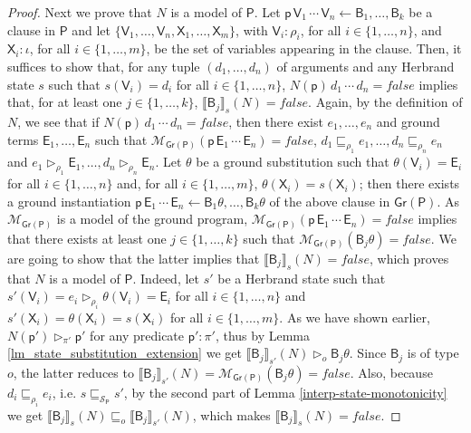 \documentclass[submission,copyright]{eptcs}
\theoremstyle{definition}
\newcommand{\mwrs}[3]{\llbracket#1\rrbracket_{#3}(#2)}
\newcommand{\aleq}[1][]{\sqsubseteq_{#1}}
\newcommand{\ee}[1][I]{\rhd_{#1}}
\newcommand{\bezem}{\mathcal{M}_\mathsf{Gr(P)}}
\begin{document}
\begin{proof}
Next we prove that $N$ is a model of $\mathsf{P}$. Let $\mathsf{p} \, \mathsf{V}_1 \, \cdots \, \mathsf{V}_n \leftarrow \mathsf{B}_1,\ldots,\mathsf{B}_k$ be a clause in $\mathsf{P}$ and let $\{\mathsf{V}_1, \ldots, \mathsf{V}_n, \mathsf{X}_1, \ldots, \mathsf{X}_m\}$, with $\mathsf{V}_i:\rho_i$, for all $i\in \{1, \ldots,n\}$, and $\mathsf{X}_i:\iota$, for all $i\in \{1, \ldots,m\}$, be the set of variables appearing in the clause. Then, it suffices to show that, for any tuple $(d_1, \ldots, d_n)$ of arguments and any Herbrand state $s$ such that $s(\mathsf{V}_i) = d_i$ for all $i\in\{1,\ldots, n\}$, $N(\mathsf{p})\,d_1\,\cdots\,d_n = \mathit{false}$ implies that, for at least one $j \in \{1,\ldots,k\}$, $\mwrs{\mathsf{B}_j}{N}{s} = \mathit{false}$. Again, by the definition of $N$, we see that if $N(\mathsf{p})\,d_1\,\cdots\,d_n = \mathit{false}$, then there exist $e_1, \ldots, e_n$ and ground terms $\mathsf{E}_1,\ldots,\mathsf{E}_n$ such that $\bezem(\mathsf{p}\, \mathsf{E}_1 \, \cdots \, \mathsf{E}_n)=\mathit{false}$, $d_1 \aleq[\rho_1] e_1, \ldots, d_n \aleq[\rho_n] e_n$ and $e_1 \ee[\rho_1] \mathsf{E}_1, \ldots, d_n \ee[\rho_n] \mathsf{E}_n$. Let $\theta$ be a ground substitution such that $\theta(\mathsf{V}_i) = \mathsf{E}_i$ for all $i\in\{1,\ldots,n\}$ and, for all $i\in\{1,\ldots,m\}$, $\theta(\mathsf{X}_i) = s(\mathsf{X}_i)$; then there exists a ground instantiation $\mathsf{p} \, \mathsf{E}_1 \, \cdots \, \mathsf{E}_n \leftarrow \mathsf{B}_1\theta,\ldots,\mathsf{B}_k\theta$ of the above clause in $\mathsf{Gr(P)}$. As $\bezem$ is a model of the ground program, $\bezem(\mathsf{p}\, \mathsf{E}_1 \, \cdots \, \mathsf{E}_n)=\mathit{false}$ implies that there exists at least one $j \in \{1,\ldots,k\}$ such that $\bezem(\mathsf{B}_j\theta)=\mathit{false}$. We are going to show that the latter implies that $\mwrs{\mathsf{B}_j}{N}{s} = \mathit{false}$, which proves that $N$ is a model of $\mathsf{P}$. Indeed, let $s'$ be a Herbrand state such that $s'(\mathsf{V}_i) = e_i \ee[\rho_i] \theta(\mathsf{V}_i) = \mathsf{E}_i$ for all $i\in\{1,\ldots, n\}$ and $s'(\mathsf{X}_i)=\theta(\mathsf{X}_i)=s(\mathsf{X}_i)$ for all $i\in\{1,\ldots,m\}$. As we have shown earlier, $N(\mathsf{p}') \ee[\pi'] \mathsf{p}'$ for any predicate $\mathsf{p}':\pi'$, thus by Lemma \ref{lm_state_substitution_extension} we get $\mwrs{\mathsf{B}_j}{N}{s'} \ee[o] \mathsf{B}_j\theta$. Since $\mathsf{B}_j$ is of type $o$, the latter reduces to $\mwrs{\mathsf{B}_j}{N}{s'} = \bezem(\mathsf{B}_j\theta) = \mathit{false}$. Also, because $d_i \aleq[\rho_i] e_i$, i.e. $s \aleq[\mathcal{S}_\mathsf{P}] s'$, by the second part of Lemma \ref{interp-state-monotonicity} we get $\mwrs{\mathsf{B}_j}{N}{s} \aleq[o] \mwrs{\mathsf{B}_j}{N}{s'}$, which makes $\mwrs{\mathsf{B}_j}{N}{s} = \mathit{false}$.


\end{proof}
\end{document}
